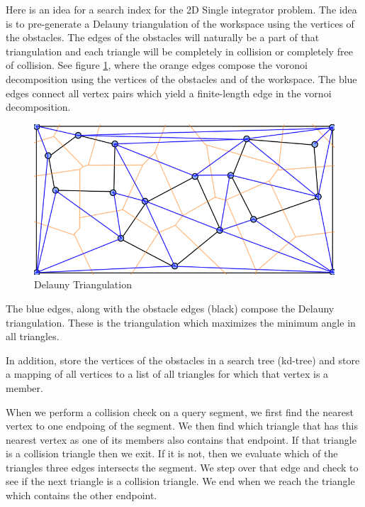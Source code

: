 Here is an idea for a search index for the 2D Single integrator problem. The idea is to pre-generate a Delauny triangulation of the workspace using the vertices of the obstacles. The edges of the obstacles will naturally be a part of that triangulation and each triangle will be completely in collision or completely free of collision. See figure \ref{fig:delauny}, where the orange edges compose the voronoi decomposition using the vertices of the obstacles and of the workspace. The blue edges connect all vertex pairs which yield a finite-length edge in the vornoi decomposition.  

\begin{figure}[H]
\begin{centering}
    \includegraphics[scale=1]{fig/delauny_collision}
    \caption{Delauny Triangulation}
    \label{fig:delauny}
\end{centering} 
\end{figure}

The blue edges, along with the obstacle edges (black) compose the Delauny triangulation. These is the triangulation which maximizes the minimum angle in all triangles. 

In addition, store the vertices of the obstacles in a search tree (kd-tree) and store a mapping of all vertices to a list of all triangles for which that vertex is a member. 

When we perform a collision check on a query segment, we first find the nearest vertex to one endpoing of the segment. We then find which triangle that has this nearest vertex as one of its members also contains that endpoint. If that triangle is a collision triangle then we exit. If it is not, then we evaluate which of the triangles three edges intersects the segment. We step over that edge and check to see if the next triangle is a collision triangle. We end when we reach the triangle which contains the other endpoint. 

